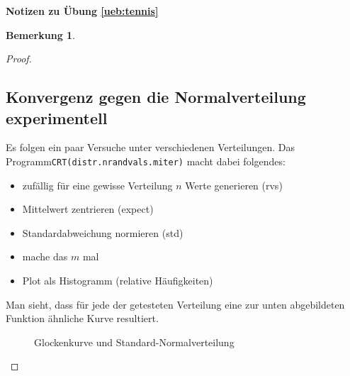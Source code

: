 \documentclass[%
<<<<<<< Updated upstream
11pt,%
twoside,%
titlepage,%
german,%
=======
11pt,%
twoside,%
titlepage,%
swissgerman,%
>>>>>>> Stashed changes
headsepline%
]{scrartcl}
\newcommand{\faReturnGray}{\textcolor{gray}{\faMailReply}} %
\theoremstyle{definition}
\newtheorem{bem}{Bemerkung}[subsection] %
\theoremstyle{plain}
\newcommand{\concatueb}[1]{ueb:#1}%
\newcommand{\concatlsg}[1]{lsg:#1}%
\newenvironment{lsg}[1]{%
    \par\noindent\textbf{Notizen zu Übung \ref{\concatueb{#1}}}\label{\concatlsg{#1}}
    \hfill\hyperref[\concatueb{#1}]{\faReturnGray}\par %
}{%
    \par%
}
\newcounter{theo}[section]\setcounter{theo}{0}
\newcommand{\concatueb}[1]{ueb:#1}%
\newcommand{\concatlsg}[1]{lsg:#1}%
\newenvironment{lsg}[1]{%
    \par\noindent\textbf{Notizen zu Übung \ref{\concatueb{#1}}.}%
    \label{\concatlsg{#1}}
}{%
    \par%
}
\begin{document}
\begin{lsg}{tennis}
\begin{bem}
\begin{proof}
\subsection{Konvergenz gegen die Normalverteilung experimentell}

Es folgen ein paar Versuche unter verschiedenen Verteilungen. Das Programm\linebreak \texttt{CRT(distr.nrandvals.miter)} macht dabei folgendes:
\begin{itemize}
    \item zufällig für eine gewisse Verteilung $n$ Werte generieren (rvs)
    \item Mittelwert zentrieren (expect)
    \item Standardabweichung normieren (std)
    \item mache das $m$ mal
    \item Plot als Histogramm (relative Häufigkeiten)
\end{itemize}

\clearpage




\clearpage

Man sieht, dass für jede der getesteten Verteilung eine zur unten abgebildeten Funktion ähnliche Kurve resultiert.

\begin{figure}
    \centering
{}
\caption{Glockenkurve und Standard-Normalverteilung}
\end{figure}


\end{proof}
\end{bem}
\end{lsg}
\end{document}
